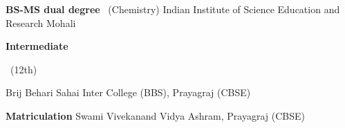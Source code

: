 	{%
		}
	{%
		\textbf{BS-MS dual degree }~(Chemistry) Indian Institute of Science Education and Research Mohali}
	{%
	 }
\vspace*{-0.6 cm}
		{%
		 	}
		{%
			\textbf{Intermediate}~\begin{footnotesize}
				~(12th)
			\end{footnotesize} Brij Behari Sahai Inter College (BBS), Prayagraj  (CBSE)}
		{%
		 }
\vspace*{-0.6 cm}
		{%
		}
		{%
			\textbf{Matriculation} Swami Vivekanand Vidya Ashram, Prayagraj (CBSE)}
		{%
		}
